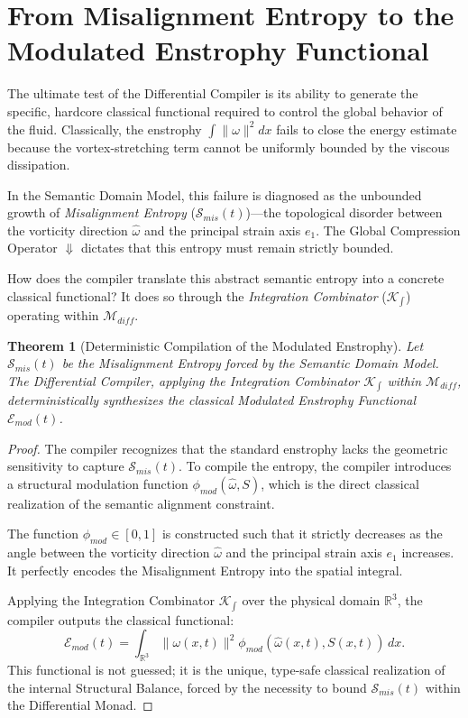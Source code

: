 \documentclass[12pt,openany]{extbook}
\theoremstyle{plain}
\newtheorem{theorem}{Theorem}[chapter]
\theoremstyle{definition}
\begin{document}
\section{From Misalignment Entropy to the Modulated Enstrophy Functional}

The ultimate test of the Differential Compiler is its ability to generate the specific, hardcore classical functional required to control the global behavior of the fluid. Classically, the enstrophy $\int \|\omega\|^2 dx$ fails to close the energy estimate because the vortex-stretching term cannot be uniformly bounded by the viscous dissipation.

In the Semantic Domain Model, this failure is diagnosed as the unbounded growth of \emph{Misalignment Entropy} ($\mathcal{S}_{mis}(t)$)—the topological disorder between the vorticity direction $\hat{\omega}$ and the principal strain axis $e_1$. The Global Compression Operator $\Downarrow$ dictates that this entropy must remain strictly bounded.

How does the compiler translate this abstract semantic entropy into a concrete classical functional? It does so through the \emph{Integration Combinator} ($\mathcal{K}_{\int}$) operating within $\mathcal{M}_{diff}$.

\begin{theorem}[Deterministic Compilation of the Modulated Enstrophy]
Let $\mathcal{S}_{mis}(t)$ be the Misalignment Entropy forced by the Semantic Domain Model. The Differential Compiler, applying the Integration Combinator $\mathcal{K}_{\int}$ within $\mathcal{M}_{diff}$, deterministically synthesizes the classical \emph{Modulated Enstrophy Functional} $\mathcal{E}_{mod}(t)$.
\end{theorem}

\begin{proof}
The compiler recognizes that the standard enstrophy lacks the geometric sensitivity to capture $\mathcal{S}_{mis}(t)$. To compile the entropy, the compiler introduces a structural modulation function $\phi_{mod}(\hat{\omega}, S)$, which is the direct classical realization of the semantic alignment constraint. 

The function $\phi_{mod} \in [0, 1]$ is constructed such that it strictly decreases as the angle between the vorticity direction $\hat{\omega}$ and the principal strain axis $e_1$ increases. It perfectly encodes the Misalignment Entropy into the spatial integral.

Applying the Integration Combinator $\mathcal{K}_{\int}$ over the physical domain $\mathbb{R}^3$, the compiler outputs the classical functional:
\[
\mathcal{E}_{mod}(t) = \int_{\mathbb{R}^3} \|\omega(x,t)\|^2 \phi_{mod}(\hat{\omega}(x,t), S(x,t)) \, dx.
\]
This functional is not guessed; it is the unique, type-safe classical realization of the internal Structural Balance, forced by the necessity to bound $\mathcal{S}_{mis}(t)$ within the Differential Monad.
\end{proof}
\end{document}

